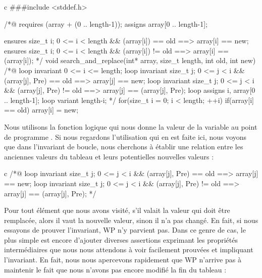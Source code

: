 \begin{CodeBlock}{c}
###include <stddef.h>

/*@
  requires \valid(array + (0 .. length-1));
  assigns array[0 .. length-1];

  ensures \forall size_t i; 0 <= i < length && \old(array[i]) == old
             ==> array[i] == new;
  ensures \forall size_t i; 0 <= i < length && \old(array[i]) != old 
             ==> array[i] == \old(array[i]);
*/
void search_and_replace(int* array, size_t length, int old, int new){
  /*@
    loop invariant 0 <= i <= length;
    loop invariant \forall size_t j; 0 <= j < i && \at(array[j], Pre) == old 
                     ==> array[j] == new;
    loop invariant \forall size_t j; 0 <= j < i && \at(array[j], Pre) != old 
                     ==> array[j] == \at(array[j], Pre);
    loop assigns i, array[0 .. length-1];
    loop variant length-i;
  */
  for(size_t i = 0; i < length; ++i){
    if(array[i] == old) array[i] = new;
  }
}
\end{CodeBlock}



Nous utilisons la fonction logique  qui nous donne la valeur de
la variable  au point de programme . Si nous regardons l'utilisation qui
en est faite ici, nous voyons que dans l'invariant de boucle, nous cherchons à 
établir une relation entre les anciennes valeurs du tableau et leurs potentielles 
nouvelles valeurs :



\begin{CodeBlock}{c}
/*@
  loop invariant \forall size_t j; 0 <= j < i && \at(array[j], Pre) == old 
                   ==> array[j] == new;
  loop invariant \forall size_t j; 0 <= j < i && \at(array[j], Pre) != old 
                   ==> array[j] == \at(array[j], Pre);
*/
\end{CodeBlock}



Pour tout élément que nous avons visité, s'il valait la valeur qui doit être
remplacée, alors il vaut la nouvelle valeur, sinon il n'a pas changé. En fait, si nous essayons de prouver l'invariant, WP n'y parvient pas. Dans ce genre de 
cas, le plus simple est encore d'ajouter diverses assertions exprimant les 
propriétés intermédiaires que nous nous attendons à voir facilement prouvées 
et impliquant l'invariant. En fait, nous nous apercevons rapidement que WP 
n'arrive pas à maintenir le fait que nous n'avons pas encore modifié la fin du 
tableau :



